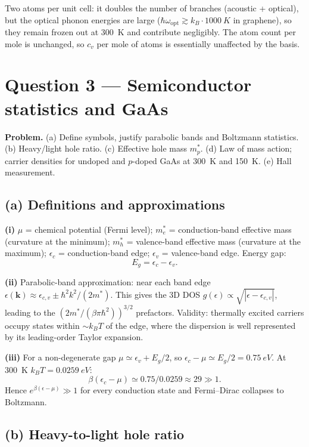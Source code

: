 \documentclass[11pt]{article}
\begin{document}
Two atoms per unit cell: it doubles the number of branches (acoustic + optical), but the optical phonon energies are large ($\hbar\omega_\text{opt}\gtrsim k_B\cdot\SI{1000}{K}$ in graphene), so they remain frozen out at \SI{300}{K} and contribute negligibly. The atom count per mole is unchanged, so $c_v$ per mole of atoms is essentially unaffected by the basis.

\section*{Question 3 --- Semiconductor statistics and GaAs}

\textbf{Problem.} (a) Define symbols, justify parabolic bands and Boltzmann statistics. (b) Heavy/light hole ratio. (c) Effective hole mass $m_p^*$. (d) Law of mass action; carrier densities for undoped and $p$-doped GaAs at \SI{300}{K} and \SI{150}{K}. (e) Hall measurement.

\subsection*{(a) Definitions and approximations}

\textbf{(i)} $\mu$ = chemical potential (Fermi level); $m_e^*$ = conduction-band effective mass (curvature at the minimum); $m_h^*$ = valence-band effective mass (curvature at the maximum); $\epsilon_c$ = conduction-band edge; $\epsilon_v$ = valence-band edge. Energy gap:
\[
\boxed{\;E_g = \epsilon_c - \epsilon_v.\;}
\]

\textbf{(ii)} Parabolic-band approximation: near each band edge $\epsilon(\bm k)\approx\epsilon_{c,v}\pm\hbar^2 k^2/(2m^*)$. This gives the 3D DOS $g(\epsilon)\propto\sqrt{|\epsilon-\epsilon_{c,v}|}$, leading to the $(2m^*/(\beta\pi\hbar^2))^{3/2}$ prefactors. Validity: thermally excited carriers occupy states within $\sim k_B T$ of the edge, where the dispersion is well represented by its leading-order Taylor expansion.

\textbf{(iii)} For a non-degenerate gap $\mu\simeq\epsilon_v + E_g/2$, so $\epsilon_c - \mu \simeq E_g/2 = \SI{0.75}{eV}$. At \SI{300}{K} $k_B T = \SI{0.0259}{eV}$:
\[
\beta(\epsilon_c - \mu) \simeq 0.75/0.0259 \approx 29 \gg 1.
\]
Hence $e^{\beta(\epsilon-\mu)}\gg 1$ for every conduction state and Fermi--Dirac collapses to Boltzmann.

\subsection*{(b) Heavy-to-light hole ratio}
\end{document}
